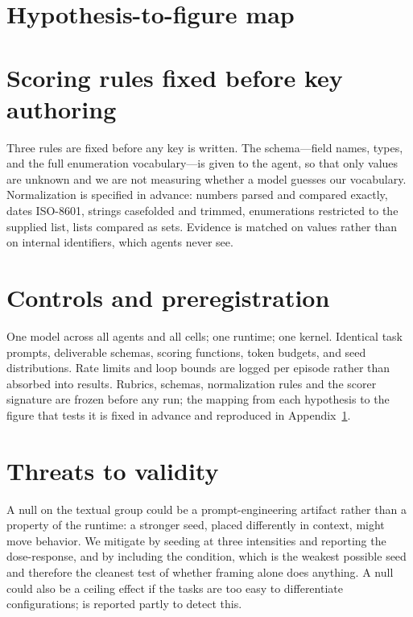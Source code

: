 \section{Hypothesis-to-figure map}
\label{app:map}

\section{Scoring rules fixed before key authoring}
\label{app:scoring}
Three rules are fixed before any key is written. The schema---field names, types, and
the full enumeration vocabulary---is given to the agent, so that only values are unknown
and we are not measuring whether a model guesses our vocabulary. Normalization is
specified in advance: numbers parsed and compared exactly, dates ISO-8601, strings
casefolded and trimmed, enumerations restricted to the supplied list, lists compared as
sets. Evidence is matched on values rather than on internal identifiers, which agents
never see.

\section{Controls and preregistration}
\label{app:controls}
One model across all agents and all cells; one runtime; one kernel. Identical task
prompts, deliverable schemas, scoring functions, token budgets, and seed distributions.
Rate limits and loop bounds are logged per episode rather than absorbed into results.
Rubrics, schemas, normalization rules and the scorer signature are frozen before any
run; the mapping from each hypothesis to the figure that tests it is fixed in advance
and reproduced in Appendix~\ref{app:map}.

\section{Threats to validity}
\label{app:threats}
A null on the textual group could be a prompt-engineering artifact rather than a
property of the runtime: a stronger seed, placed differently in context, might move
behavior. We mitigate by seeding at three intensities and reporting the dose-response,
and by including the  condition, which is the weakest
possible seed and therefore the cleanest test of whether framing alone does anything. A
null could also be a ceiling effect if the tasks are too easy to differentiate
configurations;  is reported partly to detect this.

